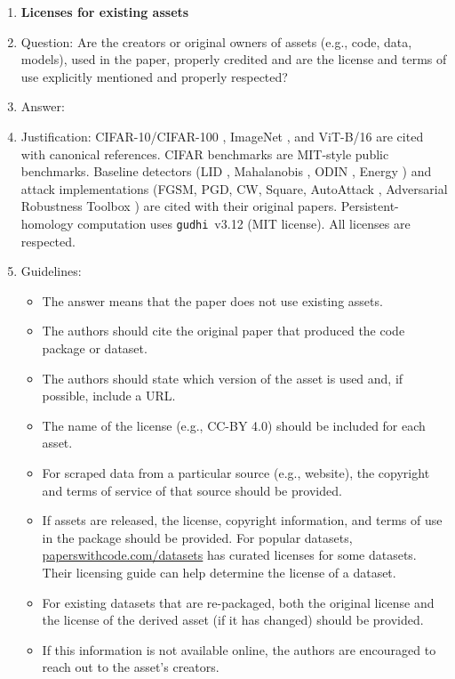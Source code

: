 \begin{enumerate}
\item {\bf Licenses for existing assets}
    \item[] Question: Are the creators or original owners of assets (e.g., code, data, models), used in the paper, properly credited and are the license and terms of use explicitly mentioned and properly respected?
    \item[] Answer: \answerYes{}
    \item[] Justification: CIFAR-10/CIFAR-100 \cite{krizhevsky2009learning}, ImageNet \cite{deng2009imagenet}, and ViT-B/16 \cite{dosovitskiy2021image} are cited with canonical references. CIFAR benchmarks are MIT-style public benchmarks. Baseline detectors (LID \cite{ma2018characterizing}, Mahalanobis \cite{lee2018simple}, ODIN \cite{liang2018enhancing}, Energy \cite{liu2020energy}) and attack implementations (FGSM, PGD, CW, Square, AutoAttack \cite{croce2020reliable}, Adversarial Robustness Toolbox \cite{nicolae2018adversarial}) are cited with their original papers. Persistent-homology computation uses \texttt{gudhi}~v3.12 \cite{gudhi2015} (MIT license). All licenses are respected.
    \item[] Guidelines:
    \begin{itemize}
        \item The answer \answerNA{} means that the paper does not use existing assets.
        \item The authors should cite the original paper that produced the code package or dataset.
        \item The authors should state which version of the asset is used and, if possible, include a URL.
        \item The name of the license (e.g., CC-BY 4.0) should be included for each asset.
        \item For scraped data from a particular source (e.g., website), the copyright and terms of service of that source should be provided.
        \item If assets are released, the license, copyright information, and terms of use in the package should be provided. For popular datasets, \url{paperswithcode.com/datasets} has curated licenses for some datasets. Their licensing guide can help determine the license of a dataset.
        \item For existing datasets that are re-packaged, both the original license and the license of the derived asset (if it has changed) should be provided.
        \item If this information is not available online, the authors are encouraged to reach out to the asset's creators.
    \end{itemize}


\end{enumerate}
